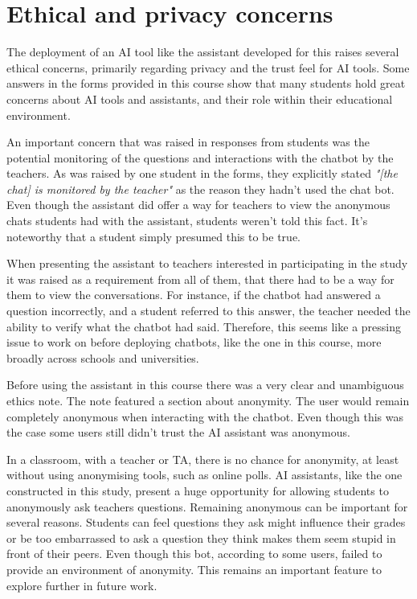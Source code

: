 \section{Ethical and privacy concerns}
\label{sec:discussion_privacy}


The deployment of an AI tool like the assistant developed for this raises several ethical concerns, primarily regarding privacy and the trust feel for AI tools. Some answers in the forms provided in this course show that many students hold great concerns about AI tools and assistants, and their role within their educational environment.


An important concern that was raised in responses from students was the potential monitoring of the questions and interactions with the chatbot by the teachers. As was raised by one student in the forms, they explicitly stated \textit{"[the chat] is monitored by the teacher"} as the reason they hadn’t used the chat bot. Even though the assistant did offer a way for teachers to view the anonymous chats students had with the assistant, students weren’t told this fact. It’s noteworthy that a student simply presumed this to be true.


When presenting the assistant to teachers interested in participating in the study it was raised as a requirement from all of them, that there had to be a way for them to view the conversations. For instance, if the chatbot had answered a question incorrectly, and a student referred to this answer, the teacher needed the ability to verify what the chatbot had said. Therefore, this seems like a pressing issue to work on before deploying chatbots, like the one in this course, more broadly across schools and universities.


Before using the assistant in this course there was a very clear and unambiguous ethics note. The note featured a section about anonymity. The user would remain completely anonymous when interacting with the chatbot. Even though this was the case some users still didn’t trust the AI assistant was anonymous.


In a classroom, with a teacher or TA, there is no chance for anonymity, at least without using anonymising tools, such as online polls. AI assistants, like the one constructed in this study, present a huge opportunity for allowing students to anonymously ask teachers questions. Remaining anonymous can be important for several reasons. Students can feel questions they ask might influence their grades or be too embarrassed to ask a question they think makes them seem stupid in front of their peers. Even though this bot, according to some users, failed to provide an environment of anonymity. This remains an important feature to explore further in future work.


